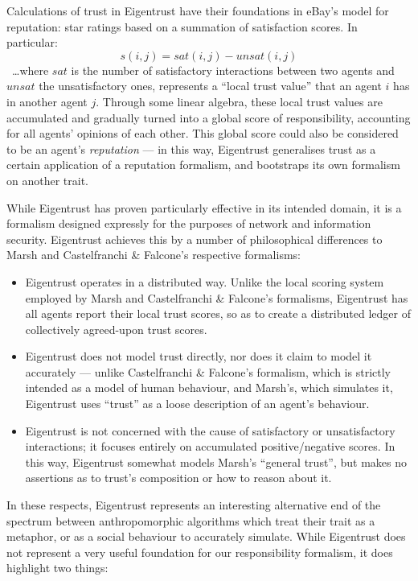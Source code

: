 Calculations of trust in Eigentrust have their foundations in eBay's model for reputation: star ratings based on a summation of satisfaction scores. In particular: \[s(i,j) = sat(i,j) - unsat(i,j)\]~\ldots{}where \(sat\) is the number of satisfactory interactions between two agents and \(unsat\) the unsatisfactory ones, represents a ``local trust value'' that an agent \(i\) has in another agent \(j\). Through some linear algebra, these local trust values are accumulated and gradually turned into a global score of responsibility, accounting for all agents' opinions of each other. This global score could also be considered to be an agent's \emph{reputation} --- in this way, Eigentrust generalises trust as a certain application of a reputation formalism, and bootstraps its own formalism on another trait.\par

While Eigentrust has proven particularly effective in its intended domain, it is a formalism designed expressly for the purposes of network and information security. Eigentrust achieves this by a number of philosophical differences to Marsh and Castelfranchi \& Falcone's respective formalisms:

\begin{itemize}
    \item Eigentrust operates in a distributed way. Unlike the local scoring system employed by Marsh and Castelfranchi \& Falcone's formalisms, Eigentrust has all agents report their local trust scores, so as to create a distributed ledger of collectively agreed-upon trust scores.
    \item Eigentrust does not model trust directly, nor does it claim to model it accurately --- unlike Castelfranchi \& Falcone's formalism, which is strictly intended as a model of human behaviour, and Marsh's, which simulates it, Eigentrust uses ``trust'' as a loose description of an agent's behaviour.
    \item Eigentrust is not concerned with the cause of satisfactory or unsatisfactory interactions; it focuses entirely on accumulated positive/negative scores. In this way, Eigentrust somewhat models Marsh's ``general trust'', but makes no assertions as to trust's composition or how to reason about it.
\end{itemize}

In these respects, Eigentrust represents an interesting alternative end of the spectrum between anthropomorphic algorithms which treat their trait as a metaphor, or as a social behaviour to accurately simulate. While Eigentrust does not represent a very useful foundation for our responsibility formalism, it does highlight two things:

